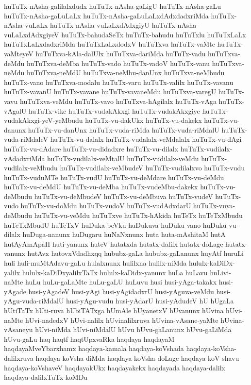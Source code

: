 {huTuTx-nAsha-galilalxdudx
huTuTx-nAsha-gaLigU
huTuTx-nAsha-gaLu
huTuTx-nAsha-gaLuLaLx
huTuTx-nAsha-gaLuLaLxdAdxdadxriMda
huTuTx-nAsha-vuLaLx
huTuTx-nAsha-vuLaLxdAdxgiyU
huTuTx-nAsha-vuLaLxdAdxgiyeV
huTuTx-bahudaSeTx
huTuTx-bahudu
huTuTxlu
huTuTxLaLx
huTuTxLaLxdadxriMda
huTuTxLaLxdodxV
huTuTxva
huTuTx-vaMte
huTuTx-vaMteyeV
huTuTxva-kAla-dalUlx
huTuTxva-dariMda
huTuTx-vadu
huTuTxva-deMdu
huTuTxva-deMba
huTuTx-vado
huTuTx-vadoV
huTuTx-vanu
huTuTxva-neMdu
huTuTxva-neMdU
huTuTxva-neMbu-danUnx
huTuTxva-neMbudu
huTuTx-vano
huTuTxva-modalu
huTuTx-varu
huTuTx-valilx
huTuTx-vavanu
huTuTx-vavanU
huTuTx-vavane
huTuTx-vavaneMdu
huTuTxva-varegU
huTuTx-vavu
huTuTxva-veMdu
huTuTx-vavo
huTuTxva-hAgilalx
huTuTx-vAga
huTuTx-vAgalU
huTuTx-vike
huTuTx-vudakAkxgi
huTuTx-vudakAkxgiye
huTuTx-vudakAkxgi-yeV-yeMbudu
huTuTx-vu-dakUkx
huTuTx-vu-dakekx
huTuTx-vu-danunx
huTuTx-vu-danUnx
huTuTx-vuda-riMda
huTuTx-vuda-riMdalU
huTuTx-vuda-riMdaleV
huTuTx-vu-dalalx
huTuTx-vudalalx-veMdalalx
huTuTx-vu-dAgi
huTuTx-vu-dAdare
huTuTx-vu-didadxre
huTuTx-vu-dilalx
huTuTx-vudilalx-vAdadxriMda
huTuTx-vudilalx-veMtalU
huTuTx-vudilalx-veMdu
huTuTx-vudilalx-veMbudu
huTuTx-vudilalx-veMbudeV
huTuTx-vudilalxvo
huTuTx-vudu
huTuTx-vuduMTe
huTuTx-vudU
huTuTx-vu-deMdare
huTuTx-vu-deMdu
huTuTx-vu-deMdU
huTuTx-vu-deMba
huTuTx-vudeMbu-dakekx
huTuTx-vu-deMbudu
huTuTx-vu-deMbudeV
huTuTx-vu-deMbuva
huTuTx-vudeV
huTuTx-vudo
huTuTx-vu-doMdu
huTuTx-vudoV
huTuTx-vudAdxdarU
huTuTx-vuva-deMbudu
huTuTx-vu-veMdu
huTuTxve
huTuTx-hAkida
huTeTx
huTeTxMbudu
huTeTxMbudU
huTeTxV
huDuka-beVku
huDukuva
huDuku-vano
huDuku-vu-dilalx
huDuga-nanunx
huDugaru
huNaNxnunx
huta
huta-mAshitaM
hutA
hutAyAmApaH
huti-yanunx
huteV
hutatxda
hutatx-dalilx
hutatx-doLage
hutatx-vanunx
hutAvx
hutovxVdadhxqq
hububx-gaLa
hububx-gaLanunx
huyAtf
huruLi
huli
huli-muMtAdavu-gaLu
hulalxnunx
hulilxna
hulilx-niMda
hululx-kaDiDx-yalilx
hululx-kaDiDxyalilxTaTx
hululx-kaDidx-yanunx
huLa
huLavu
huLivi-naMte
huLu
huLu-gaLaMte
huLu-gaLU
huLuvu
husi
husi-yAga-takakx
husi-yAgade
husi-yAgadeV
husi-yAgi
husi-yAgidadxrU
husi-yAguva-veMdu
husi-yAgu-vuda-riMdalU
husi-yAgu-vudu
husi-yAdarU
husi-yAdudeV
hU
hUgaLa
hUtiTaTx
hUti-ruva
hUbiTATxga
hUmAle
hUyanetxV
hUvanunx
hUvina
hUvi-naMte
hUvi-nadedxV
hUvi-nalilx
hUvinalilxruva
hUvina-vAsane-yaMte
hUvina-vAsaneyu
hUvi-niMda
hUvi-niMdalU
hUvu
hUvu-gaLanunx
hUvu-gaLiMda
hUvu-gaLu
haq
haqtf
haqtUpxvaRka
haqdaya
haqdayaM
haqdayaMveYbarxhamx
haqdaya-kamala
haqdaya-koVshada
haqdaya-koVsha-dalilxruva
haqdaya-koVsha-diMda
haqdaya-koVsha-doLage
haqdaya-koV-shavu
haqdaya-koVshaveV
haqdayakUkx
haqdayakekx
haqdayada
haqdaya-dalilx
haqdaya-dalilxTuTx-koMDu
}

